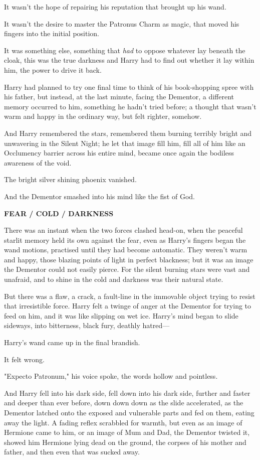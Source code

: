 It wasn't the hope of repairing his reputation that brought up his wand.

It wasn't the desire to master the Patronus Charm as magic, that moved his
fingers into the initial position.

It was something else, something that \emph{had} to oppose whatever lay beneath
the cloak, this was the true darkness and Harry had to find out whether it lay
within him, the power to drive it back.

Harry had planned to try one final time to think of his book-shopping spree
with his father, but instead, at the last minute, facing the Dementor, a
different memory occurred to him, something he hadn't tried before; a thought
that wasn't warm and happy in the ordinary way, but felt righter, somehow.

And Harry remembered the stars, remembered them burning terribly bright and
unwavering in the Silent Night; he let that image fill him, fill all of him
like an Occlumency barrier across his entire mind, became once again the
bodiless awareness of the void.

The bright silver shining phoenix vanished.

And the Dementor smashed into his mind like the fist of God.

\textbf{FEAR / COLD / DARKNESS}

There was an instant when the two forces clashed head-on, when the peaceful
starlit memory held its own against the fear, even as Harry's fingers began the
wand motions, practised until they had become automatic. They weren't warm and
happy, those blazing points of light in perfect blackness; but it was an image
the Dementor could not easily pierce. For the silent burning stars were vast
and unafraid, and to shine in the cold and darkness was their natural state.

But there was a flaw, a crack, a fault-line in the immovable object trying to
resist that irresistible force. Harry felt a twinge of anger at the Dementor
for trying to feed on him, and it was like slipping on wet ice. Harry's mind
began to slide sideways, into bitterness, black fury, deathly hatred—

Harry's wand came up in the final brandish.

It felt wrong.

"Expecto Patronum," his voice spoke, the words hollow and pointless.

And Harry fell into his dark side, fell down into his dark side, further and
faster and deeper than ever before, down down down as the slide accelerated, as
the Dementor latched onto the exposed and vulnerable parts and fed on them,
eating away the light. A fading reflex scrabbled for warmth, but even as an
image of Hermione came to him, or an image of Mum and Dad, the Dementor twisted
it, showed him Hermione lying dead on the ground, the corpses of his mother and
father, and then even that was sucked away.


